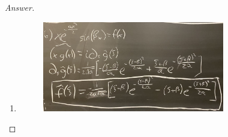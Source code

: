 \documentclass{article}
\theoremstyle{definition}
\renewcommand\qedsymbol{$\blacksquare$}
\newenvironment{ans}{\begin{proof}[Answer]\renewcommand{\qedsymbol}{}}{\end{proof}}
\begin{document}
\begin{ans}
\begin{enumerate}
        \item \phantom{.}
        \begin{figure}[H]
            \centering
            \includegraphics[width = 0.75\textwidth]{Problem 4 Part 6.jpeg}
        \end{figure}
    \end{enumerate}
\end{ans}
\end{document}
